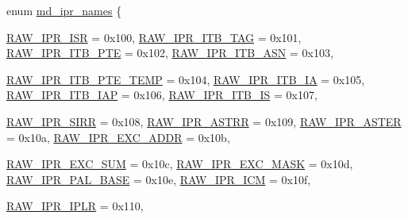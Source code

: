 \begin{DoxyCompactItemize}
\item 
enum \hyperlink{namespaceAlphaISA_a0cd208652efde0d49b6a875aea151470}{md\_\-ipr\_\-names} \{ \par
\hyperlink{namespaceAlphaISA_a0cd208652efde0d49b6a875aea151470a296206f00e119c65c195098b74b9ff40}{RAW\_\-IPR\_\-ISR} =  0x100, 
\hyperlink{namespaceAlphaISA_a0cd208652efde0d49b6a875aea151470ac57bbd72e5f9fa64347a0fee7fd818b6}{RAW\_\-IPR\_\-ITB\_\-TAG} =  0x101, 
\hyperlink{namespaceAlphaISA_a0cd208652efde0d49b6a875aea151470ad4d60cfe52d4092e11fd512b2ebd3299}{RAW\_\-IPR\_\-ITB\_\-PTE} =  0x102, 
\hyperlink{namespaceAlphaISA_a0cd208652efde0d49b6a875aea151470a91a0abbf9ce65ed8fc6bd33ea88cc05d}{RAW\_\-IPR\_\-ITB\_\-ASN} =  0x103, 
\par
\hyperlink{namespaceAlphaISA_a0cd208652efde0d49b6a875aea151470add9139d0b57b8e3de88b07dc61516ec4}{RAW\_\-IPR\_\-ITB\_\-PTE\_\-TEMP} =  0x104, 
\hyperlink{namespaceAlphaISA_a0cd208652efde0d49b6a875aea151470a87709ba87f9d94bc5558b8d3ecf0b357}{RAW\_\-IPR\_\-ITB\_\-IA} =  0x105, 
\hyperlink{namespaceAlphaISA_a0cd208652efde0d49b6a875aea151470aef7cee5902dee4de8f5677a4de87102a}{RAW\_\-IPR\_\-ITB\_\-IAP} =  0x106, 
\hyperlink{namespaceAlphaISA_a0cd208652efde0d49b6a875aea151470a273e176ded7378f82bdca1d7b3db457f}{RAW\_\-IPR\_\-ITB\_\-IS} =  0x107, 
\par
\hyperlink{namespaceAlphaISA_a0cd208652efde0d49b6a875aea151470a4404c9b05a6bfe2dcf0a25f824cc5521}{RAW\_\-IPR\_\-SIRR} =  0x108, 
\hyperlink{namespaceAlphaISA_a0cd208652efde0d49b6a875aea151470a659ea29c0241f78bc5c35827c597b8f4}{RAW\_\-IPR\_\-ASTRR} =  0x109, 
\hyperlink{namespaceAlphaISA_a0cd208652efde0d49b6a875aea151470a796aef08d2249f0e20615c0ec09c9d03}{RAW\_\-IPR\_\-ASTER} =  0x10a, 
\hyperlink{namespaceAlphaISA_a0cd208652efde0d49b6a875aea151470a80d1e79570f78965eef46523151266e2}{RAW\_\-IPR\_\-EXC\_\-ADDR} =  0x10b, 
\par
\hyperlink{namespaceAlphaISA_a0cd208652efde0d49b6a875aea151470adc1e6d6885805dd267ad216d1eaf9e58}{RAW\_\-IPR\_\-EXC\_\-SUM} =  0x10c, 
\hyperlink{namespaceAlphaISA_a0cd208652efde0d49b6a875aea151470a5c1150e225bdf6ad12cf93f63cb7e590}{RAW\_\-IPR\_\-EXC\_\-MASK} =  0x10d, 
\hyperlink{namespaceAlphaISA_a0cd208652efde0d49b6a875aea151470ad56ec04b2871be4fb9a5efe66b1c64e1}{RAW\_\-IPR\_\-PAL\_\-BASE} =  0x10e, 
\hyperlink{namespaceAlphaISA_a0cd208652efde0d49b6a875aea151470a9eceec308bb08c9317beb95bbca91f60}{RAW\_\-IPR\_\-ICM} =  0x10f, 
\par
\hyperlink{namespaceAlphaISA_a0cd208652efde0d49b6a875aea151470a75aed1269138e1dcb819ded3ca558f7a}{RAW\_\-IPR\_\-IPLR} =  0x110, 

\end{DoxyCompactItemize}
